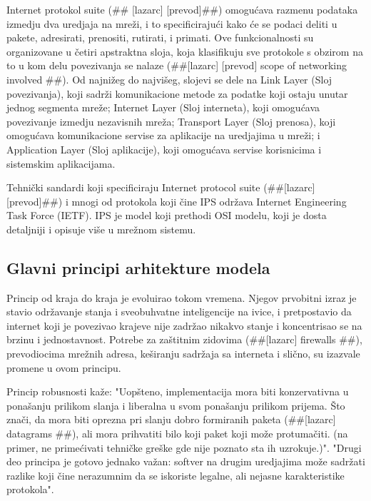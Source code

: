 \documentclass[a4paper,12pt, master]{etf}
\begin{document}
	Internet protokol suite (\#\# [lazarc] [prevod]\#\#) omogu\'{c}ava razmenu podataka izmedju dva
	uredjaja na mre\v{z}i, i to specificiraju\'{c}i kako \'{c}e se podaci deliti u pakete, adresirati,
	prenositi, rutirati, i primati. Ove funkcionalnosti su organizovane u \v{c}etiri apstraktna
	sloja, koja klasifikuju sve protokole s obzirom na to u kom delu povezivanja se nalaze
	(\#\#[lazarc] [prevod] scope of networking involved \#\#). Od najni\v{z}eg do najvi\v{s}eg,
	slojevi se dele na Link	Layer (Sloj povezivanja), koji sadr\v{z}i komunikacione metode za
	podatke koji ostaju unutar jednog segmenta mre\v{z}e; Internet Layer (Sloj interneta), koji
	omogu\'{c}ava povezivanje izmedju nezavisnih mre\v{z}a; Transport Layer (Sloj prenosa), koji
	omogu\'{c}ava komunikacione servise za aplikacije na uredjajima u mre\v{z}i; i Application Layer
	(Sloj aplikacije), koji omogu\'{c}ava servise korisnicima i	sistemskim aplikacijama.

	Tehni\v{c}ki sandardi koji specificiraju Internet protocol suite (\#\#[lazarc] [prevod]\#\#) i
	mnogi od protokola koji \v{c}ine IPS odr\v{z}ava Internet Engineering Task Force (IETF). IPS je
	model koji prethodi OSI modelu, koji je dosta detaljniji i opisuje vi\v{s}e u mre\v{z}nom sistemu.

	\subsection{Glavni principi arhitekture modela}

	Princip od kraja do kraja je evoluirao tokom vremena. Njegov prvobitni izraz je stavio
	odr\v{z}avanje stanja i sveobuhvatne inteligencije na ivice, i pretpostavio da internet koji je
	povezivao krajeve nije zadr\v{z}ao nikakvo stanje i koncentrisao se na brzinu i jednostavnost.
	Potrebe za za\v{s}titnim zidovima (\#\#[lazarc] firewalls \#\#), prevodiocima mre\v{z}nih adresa,
	ke\v{s}iranju sadr\v{z}aja sa interneta i sli\v{c}no, su izazvale promene u ovom principu.

	Princip robusnosti ka\v{z}e: "Uop\v{s}teno, implementacija mora biti konzervativna u pona\v{s}anju
	prilikom slanja i liberalna u svom pona\v{s}anju prilikom prijema. \v{S}to zna\v{c}i, da mora biti
	oprezna pri slanju dobro formiranih paketa (\#\#[lazarc] datagrams \#\#), ali mora
	prihvatiti bilo koji paket koji mo\v{z}e protuma\v{c}iti. (na primer, ne prime\'{c}ivati tehni\v{c}ke gre\v{s}ke
	gde nije poznato sta ih uzrokuje.)". "Drugi deo principa je gotovo jednako va\v{z}an: softver na
	drugim uredjajima mo\v{z}e sadr\v{z}ati razlike koji \v{c}ine nerazumnim da se iskoriste legalne, ali
	nejasne karakteristike protokola".
\end{document}
